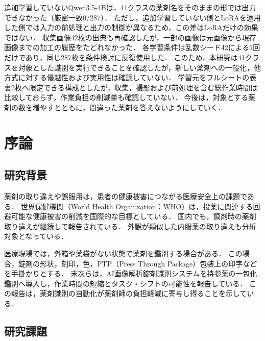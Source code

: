\documentclass[uplatex,dvipdfmx]{jsarticle}
\begin{document}
追加学習していないQwen3.5-4Bは，41クラスの薬剤名をそのままの形では出力できなかった（厳密一致0/287）．
ただし，追加学習していない側とLoRAを適用した側では入力の前処理と出力の制御が異なるため，この差はLoRAだけの効果ではない．
収集画像42枚の出典も再確認したが，一部の画像は元画像から現存画像までの加工の履歴をたどれなかった．
各学習条件は乱数シード42による1回だけであり，同じ287枚を条件検討に反復使用した．
このため，本研究は41クラスを対象とした識別を実行できることを確認したが，新しい薬剤への一般化，他方式に対する優越性および実用性は確認していない．
学習元をフルシートの表裏2枚へ限定できる構成としたが，収集，撮影および前処理を含む総作業時間は比較しておらず，作業負担の削減量も確認していない．
今後は，対象とする薬剤の数を増やすとともに，間違った薬剤を答えないようにしていく．

\newpage

{\small
\tableofcontents
}
\clearpage
\setcounter{page}{1}
\pagestyle{plain}

\section{序論}

\subsection{研究背景}

薬剤の取り違えや誤服用は，患者の健康被害につながる医療安全上の課題である．
世界保健機関（World Health Organization：WHO）は，投薬に関連する回避可能な健康被害の削減を国際的な目標としている\cite{who_medication}．
国内でも，調剤時の薬剤取り違えが継続して報告されている\cite{jcqhc_hiyari}．
外観が類似した内服薬の取り違えも分析対象となっている\cite{jcqhc_similarity}．

医療現場では，外箱や薬袋がない状態で薬剤を鑑別する場合がある．
この場合，錠剤の形状，刻印，色，PTP（Press Through Package）包装上の印字などを手掛かりとする．
末次らは，AI画像解析錠剤識別システムを持参薬の一包化鑑別へ導入し，作業時間の短縮とタスク・シフトの可能性を報告している\cite{suetsugu2026ai}．
この報告は，薬剤識別の自動化が薬剤師の負担軽減に寄与し得ることを示している．

\subsection{研究課題}
\end{document}
